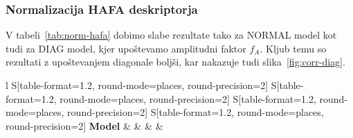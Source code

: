 \begin{comment}
\subsubsection{Jedro GHI}
\begin{table}[!htbp]
	\centering
	\begin{tabular}{l S[table-format=1.2, round-mode=places, round-precision=2] S[table-format=1.2, round-mode=places, round-precision=2] S[table-format=1.2, round-mode=places, round-precision=2] S[table-format=1.2, round-mode=places, round-precision=2]}
		\toprule
		\textbf{Model} & \thead{CORR} & \thead{RAE} & \thead{RRSE} & \thead{nSV} \\
		\midrule
		\bottomrule
	\end{tabular}
	\caption{Ghi vmax800}
	\label{tab:ghi}
\end{table}

\begin{figure}[!htbp]
	\centering
	\caption{Ghi best - eem-sv-lag(sv)}
	\label{fig:ghi}
\end{figure}
\end{comment}


\subsubsection{Normalizacija HAFA deskriptorja}
V tabeli~\ref{tab:norm-hafa} dobimo slabe rezultate tako za NORMAL model kot tudi za DIAG model, kjer upoštevamo amplitudni faktor $f_A$. Kljub temu so rezultati z upoštevanjem diagonale boljši, kar nakazuje tudi slika~\ref{fig:corr-diag}.

\begin{table}[!htbp]
	\centering
	\begin{tabular}{l S[table-format=1.2, round-mode=places, round-precision=2] S[table-format=1.2, round-mode=places, round-precision=2] S[table-format=1.2, round-mode=places, round-precision=2] S[table-format=1.2, round-mode=places, round-precision=2]}
		\toprule
		\textbf{Model} & \thead{\corr} & \thead{\rae} & \thead{\rrse} & \thead{\nsv}\\
		\midrule
		\bottomrule
	\end{tabular}
	\caption[Evaluacijske metrike pri primerjavi modelov NORMAL in DIAG]{Evaluacijske metrike pri primerjavi modelov NORMAL in DIAG, kjer upoštevamo amplitudni faktor $f_A$. }
	\label{tab:norm-hafa}
\end{table}

